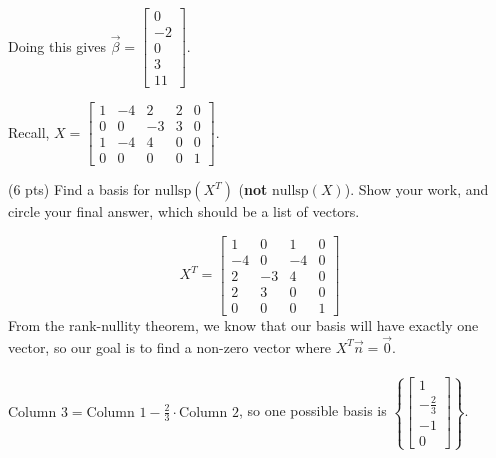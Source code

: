 \documentclass[11pt]{article}
\begin{document}
\begin{prob}
\begin{subprob}
\begin{solution}
Doing this gives $\vec \beta = \boxed{\begin{bmatrix} 0 \\ -2 \\ 0 \\ 3 \\ 11 \end{bmatrix}}$.
\end{solution}
\end{subprob}

\newpage

Recall, $X = \begin{bmatrix}
1 & -4 & 2 & 2 & 0 \\
0 & 0 & -3 & 3 & 0 \\
1 & -4 & 4 & 0 & 0 \\
0 & 0 & 0 & 0 & 1
\end{bmatrix}$.

\begin{subprob}(6 pts) Find a basis for $\text{nullsp}(X^T)$ (\textbf{not} $\text{nullsp}(X)$). Show your work, and $\boxed{\text{circle}}$ your final answer, which should be a list of vectors. \\

\emptybox{15cm}

\begin{solution}
$$
X^T=
\begin{bmatrix}
1 & 0 & 1 & 0 \\
-4 & 0 & -4 & 0 \\ 
2 & -3 & 4 & 0 \\
2 & 3 & 0 & 0 \\
0 & 0 & 0 & 1
\end{bmatrix}
$$
From the rank-nullity theorem, we know that our basis will have exactly one vector, so our goal is to find a non-zero vector where $X^T \vec n = \vec 0$. 
\\
\\$\text{Column 3}=\text{Column 1} - \frac{2}{3}\cdot \text{Column 2}$, so one possible basis is $\left\{ \begin{bmatrix} 1 \\ -\frac{2}{3} \\ -1 \\ 0\end{bmatrix}\right\}$.
\end{solution}
\end{subprob}

\newpage



\end{prob}
\end{document}
